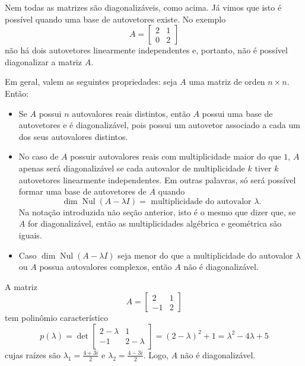 Nem todas as matrizes são diagonalizáveis, como acima. Já vimos que isto é possível quando uma base de autovetores existe. No exemplo
\begin{equation}
A = \begin{bmatrix}
2&1 \\ 0&2
\end{bmatrix}
\end{equation} não há dois autovetores linearmente independentes e, portanto, não é possível diagonalizar a matriz $A$.


\vspace{0.3cm}

Em geral, valem as seguintes propriedades: seja $A$ uma matriz de orden $n \times n$. Então:
\begin{itemize}
	\item Se $A$ possui $n$ autovalores reais distintos, então $A$ possui uma base de autovetores e é diagonalizável, pois possui um autovetor associado a cada um dos seus autovalores distintos.
	\item No caso de $A$ possuir autovalores reais com multiplicidade maior do que $1$, $A$ apenas será diagonalizável se cada autovalor de multiplicidade $k$ tiver $k$ autovetores linearmente independentes. Em outras palavras, só será possível formar uma base de autovetores de $A$ quando
	\begin{equation}
	\operatorname{dim} \operatorname{Nul} (A - \lambda I) = \text{ multiplicidade do autovalor } \lambda.
	\end{equation} Na notação introduzida não seção anterior, isto é o mesmo que dizer que, se $A$ for diagonalizável, então as multiplicidades algébrica e geométrica são iguais.
	\item Caso $\dim \operatorname{Nul} (A - \lambda I)$ seja menor do que a multiplicidade do autovalor $\lambda$ ou $A$ possua autovalores complexos, então $A$ não é diagonalizável.
\end{itemize}


\begin{ex}
	A matriz
	\begin{equation}
	A = \begin{bmatrix}
	2&1 \\ -1&2
	\end{bmatrix}
	\end{equation} tem polinômio característico
	\begin{equation}
	p(\lambda) = \det \begin{bmatrix}
	2-\lambda&1 \\ -1&2-\lambda
	\end{bmatrix} = (2-\lambda)^2 +1 = \lambda^2 -4\lambda +5
	\end{equation} cujas raízes são $\lambda_1 = \frac{4 + 3i}{2}$ e $\lambda_2 = \frac{4 - 3i}{2}$. Logo, $A$ não é diagonalizável.
\end{ex}


